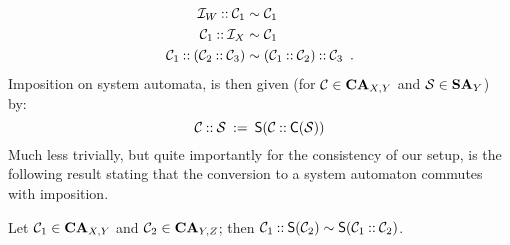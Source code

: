 %
\begin{align*}
\cI_{W}\on \cC_1 & \sim \cC_1 \\
\cC_1\on \cI_X & \sim \cC_1 \\
\cC_1\on(\cC_2\on \cC_3) & \sim (\cC_1\on \cC_2)\on \cC_3 \enspace.
\end{align*}
%
Imposition on system automata, is then given (for $\cC\in \CA_{X,Y}$ and $\cS\in \SA_Y$) by:
%
\[ \cC\on \cS \:\isdef\: \toS{\cC\on \toC\cS} \]
%
Much less trivially, but quite importantly for the consistency of our setup, is the following result stating that the conversion to a system automaton commutes with imposition.

\begin{proposition}
Let $\cC_1\in \CA_{X,Y}$ and $\cC_2\in \CA_{Y,Z}$; then $\cC_1\on \toS{\cC_2} \sim \toS{\cC_1\on \cC_2}$.
\end{proposition}

